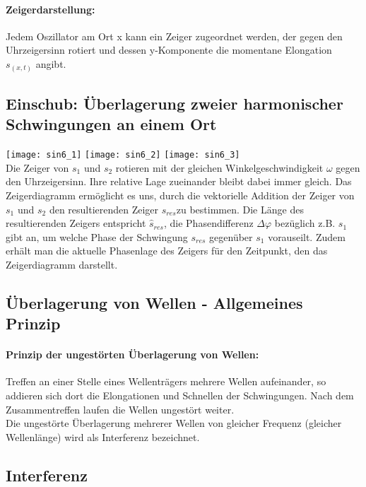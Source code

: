 \paragraph{Zeigerdarstellung:} Jedem Oszillator am Ort x kann ein Zeiger zugeordnet werden, der gegen den Uhrzeigersinn rotiert und dessen y-Komponente die momentane Elongation $s_{(x,t)}$ angibt. 

\newpage

\subsection{Einschub: Überlagerung zweier harmonischer Schwingungen an einem Ort}
\texttt{[image: sin6\_1]}
\texttt{[image: sin6\_2]}
\texttt{[image: sin6\_3]}
\vspace{2mm} \\
Die Zeiger von $s_{1}$ und $s_{2}$ rotieren mit der gleichen Winkelgeschwindigkeit $\omega$ gegen den Uhrzeigersinn. Ihre relative Lage zueinander bleibt dabei immer gleich. Das Zeigerdiagramm ermöglicht es uns, durch die vektorielle Addition der Zeiger von $s_{1}$ und $s_{2}$ den resultierenden Zeiger $s_{res}$zu bestimmen. Die Länge des resultierenden Zeigers entspricht $\hat{s}_{res}$, die Phasendifferenz $\Delta \varphi$ bezüglich z.B. $s_{1}$ gibt an, um welche Phase der Schwingung $s_{res}$ gegenüber $s_{1}$ vorauseilt. Zudem erhält man die aktuelle Phasenlage des Zeigers für den Zeitpunkt, den das Zeigerdiagramm darstellt. 
\newpage

\subsection{Überlagerung von Wellen - Allgemeines Prinzip}
\paragraph{Prinzip der ungestörten Überlagerung von Wellen:}
Treffen an einer Stelle eines Wellenträgers mehrere Wellen aufeinander, so addieren sich dort die Elongationen und Schnellen der Schwingungen. Nach dem Zusammentreffen laufen die Wellen ungestört weiter. \\
Die ungestörte Überlagerung mehrerer Wellen von gleicher Frequenz (gleicher Wellenlänge) wird als Interferenz bezeichnet.

\subsection{Interferenz}
